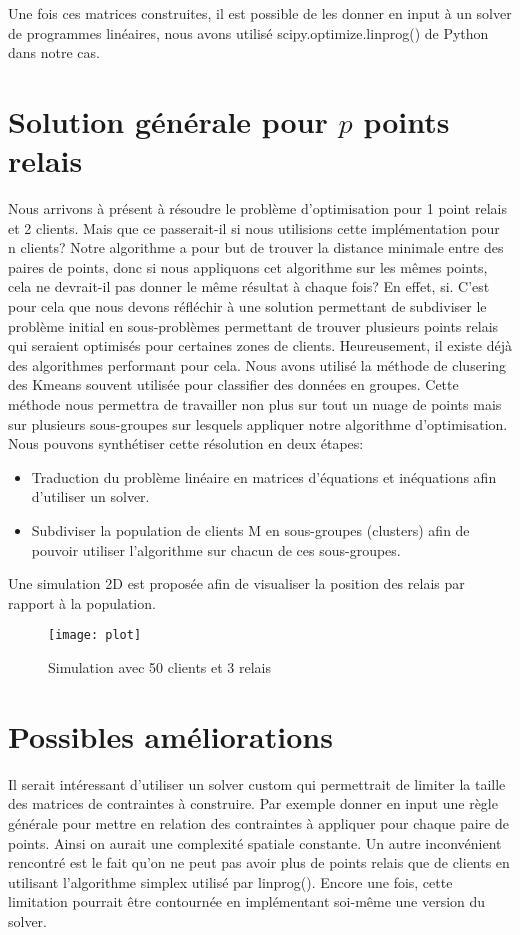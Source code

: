 \documentclass[12pt, oneside]{article}
\begin{document}
Une fois ces matrices construites, il est possible de les donner en input à un solver de programmes linéaires, nous avons utilisé scipy.optimize.linprog() de Python dans notre cas.

\section{Solution générale pour \(p\) points relais}
Nous arrivons à présent à résoudre le problème d'optimisation pour 1 point relais et 2 clients.
Mais que ce passerait-il si nous utilisions cette implémentation pour n clients? Notre algorithme a pour but de trouver la distance minimale entre des paires de points, donc si nous appliquons cet algorithme sur les mêmes points, cela ne devrait-il pas donner le même résultat à chaque fois? En effet, si. C'est pour cela que nous devons réfléchir à une solution permettant de subdiviser le problème initial en sous-problèmes permettant de trouver plusieurs points relais qui seraient optimisés pour certaines zones de clients. Heureusement, il existe déjà des algorithmes performant pour cela. Nous avons utilisé la méthode de clusering des Kmeans souvent utilisée pour classifier des données en groupes. Cette méthode nous permettra de travailler non plus sur tout un nuage de points mais sur plusieurs sous-groupes sur lesquels appliquer notre algorithme d'optimisation. Nous pouvons synthétiser cette résolution en deux étapes:

\begin{itemize}
\item Traduction du problème linéaire en matrices d'équations et inéquations afin d'utiliser un solver.
\item Subdiviser la population de clients M en sous-groupes (clusters) afin de pouvoir utiliser l'algorithme sur chacun de ces sous-groupes.
\end{itemize}

Une simulation 2D est proposée afin de visualiser la position des relais par rapport à la population.
\begin{figure}[ht]
\centering
\texttt{[image: plot]}
\caption{Simulation avec 50 clients et 3 relais}
\label{fig1}
\end{figure}

\section{Possibles améliorations}
Il serait intéressant d'utiliser un solver custom qui permettrait de limiter la taille des matrices de contraintes à construire. Par exemple donner en input une règle générale pour mettre en relation des contraintes à appliquer pour chaque paire de points. Ainsi on aurait une complexité spatiale constante. Un autre inconvénient rencontré est le fait qu'on ne peut pas avoir plus de points relais que de clients en utilisant l'algorithme simplex utilisé par linprog(). Encore une fois, cette limitation pourrait être contournée en implémentant soi-même une version du solver.
\end{document}
